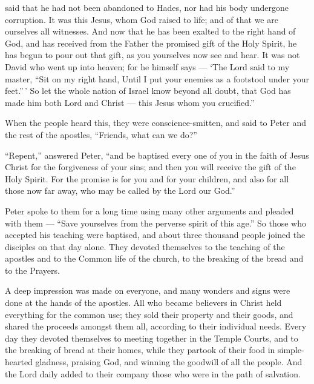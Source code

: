 said that he had not been abandoned to Hades, nor had his body undergone
corruption.  It was this Jesus, whom God raised to life;
and of that we are ourselves all witnesses.  And now that
he has been exalted to the right hand of God, and has received from the
Father the promised gift of the Holy Spirit, he has begun to pour out
that gift, as you yourselves now see and hear.  It was not
David who went up into heaven; for he himself says --- `The Lord said to
my master, ``Sit on my right hand,  Until I put your
enemies as a footstool under your feet.''\,'  So let the
whole nation of Israel know beyond all doubt, that God has made him both
Lord and Christ --- this Jesus whom you crucified.''

 When the people heard this, they were conscience-smitten,
and said to Peter and the rest of the apostles, ``Friends, what can we
do?''

 ``Repent,'' answered Peter, ``and be baptised every one of
you in the faith of Jesus Christ for the forgiveness of your sins; and
then you will receive the gift of the Holy Spirit.  For the
promise is for you and for your children, and also for all those now far
away, who may be called by the Lord our God.''

 Peter spoke to them for a long time using many other
arguments and pleaded with them --- ``Save yourselves from the perverse
spirit of this age.''  So those who accepted his teaching
were baptised, and about three thousand people joined the disciples on
that day alone.  They devoted themselves to the teaching of
the apostles and to the Common life of the church, to the breaking of
the bread and to the Prayers.

 A deep impression was made on everyone, and many wonders
and signs were done at the hands of the apostles.  All who
became believers in Christ held everything for the common use;
 they sold their property and their goods, and shared the
proceeds amongst them all, according to their individual needs.
 Every day they devoted themselves to meeting together in
the Temple Courts, and to the breaking of bread at their homes, while
they partook of their food in simple-hearted gladness, praising God, and
winning the goodwill of all the people.  And the Lord daily
added to their company those who were in the path of salvation.

